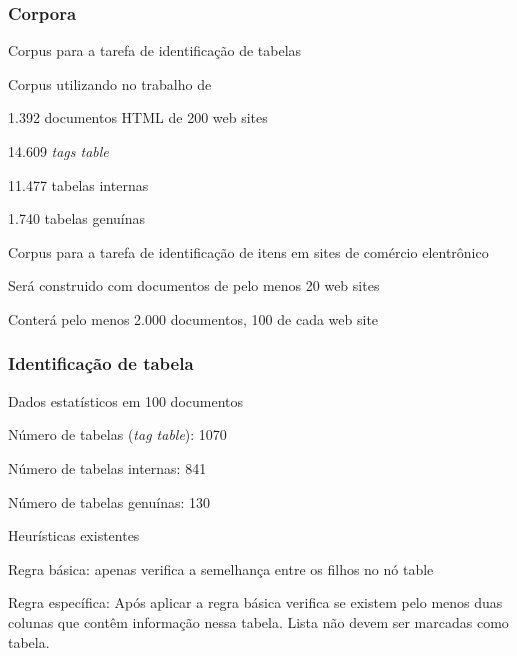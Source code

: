 \documentclass{beamer}
\newenvironment{my_itemize}{
\begin{itemize}
  \setlength{\itemsep}{5pt}
  \setlength{\parskip}{2pt}
  \setlength{\parsep}{3pt}
}{\end{itemize}}
\begin{document}
\begin{frame}
\frametitle{Corpora}
  \begin{my_itemize}
    \item Corpus para a tarefa de identificação de tabelas
    \begin{my_itemize}
      \item Corpus utilizando no trabalho de ~\cite{Wang2002}
      \item 1.392 documentos HTML de 200 web sites
      \item 14.609 \it{tags table}
      \item 11.477 tabelas internas
      \item 1.740 tabelas genuínas
    \end{my_itemize}
\pause

    \item Corpus para a tarefa de identificação de itens em sites de
    comércio elentrônico
    \begin{my_itemize}
      \item Será construido com documentos de pelo menos 20 web sites
      \item Conterá pelo menos 2.000 documentos, 100 de cada web site
    \end{my_itemize}
    
  \end{my_itemize}

\end{frame}


\begin{frame}
  \frametitle{Identificação de tabela}
  \begin{my_itemize}
   \item Dados estatísticos em 100 documentos
   \begin{my_itemize}
   \item Número de tabelas (\textit{tag table}): 1070
   \item Número de tabelas internas: 841 
   \item Número de tabelas genuínas: 130
   \end{my_itemize}

\pause
   \item Heurísticas existentes
   \begin{my_itemize}
   \item Regra básica: apenas verifica a semelhança entre os filhos no nó table
   \item Regra específica: Após aplicar a regra básica verifica se
   existem pelo menos duas colunas que contêm informação nessa tabela.
   Lista não devem ser marcadas como tabela.

   \end{my_itemize}
  \end{my_itemize}
\end{frame}
\end{document}
